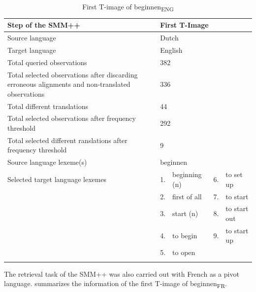 \begin{table}
\caption{First T-image of beginnen\textsubscript{ENG}\label{tab:3:6}}
\small
\begin{tabularx}{\textwidth}{p{}lXlX}
\lsptoprule
Step of the SMM++ & \multicolumn{4}{l}{First T-Image}\\ \midrule
\rowcolor{lsLightGray} Source language & \multicolumn{4}{l}{Dutch}\\
Target language & \multicolumn{4}{l}{English}\\
\rowcolor{lsLightGray} Total queried observations & \multicolumn{4}{l}{382}\\
Total selected observations after discarding erroneous alignments and non-translated observations &  \multicolumn{4}{l}{336}\\
\rowcolor{lsLightGray} Total different translations & \multicolumn{4}{l}{44}\\
Total selected observations after frequency threshold  & \multicolumn{4}{l}{292}\\
\rowcolor{lsLightGray} Total selected different ranslations after frequency threshold & \multicolumn{4}{l}{9}\\
Source language lexeme(s) & \multicolumn{4}{l}{beginnen}\\
\rowcolor{lsLightGray}Selected target language lexemes & 1. & beginning (n) & 6. & to set up \\
\rowcolor{lsLightGray}& 2. & first of all & 7. & to start \\
\rowcolor{lsLightGray}& 3. & start (n) & 8. & to start out \\
\rowcolor{lsLightGray}& 4. & to begin & 9. & to start up \\
\rowcolor{lsLightGray}& 5. & to open  &&\\
\lspbottomrule
\end{tabularx}
\end{table}

The retrieval task of the SMM++ was also carried out with French as a pivot language.  summarizes the information of the first T-image of beginnen\textsubscript{FR}.

